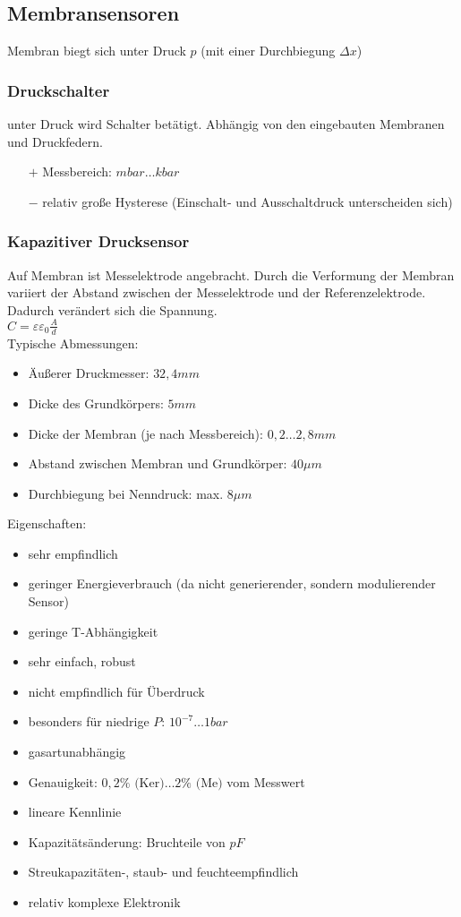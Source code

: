 \subsection{Membransensoren}
Membran biegt sich unter Druck $p$ (mit einer Durchbiegung $\Delta x$)

\subsubsection{Druckschalter}
unter Druck wird Schalter betätigt. Abhängig von den eingebauten Membranen und Druckfedern.
\begin{itemize}
\item[$+$] Messbereich: $\unit{mbar}\dots\unit{kbar}$
\item[$-$] relativ große Hysterese (Einschalt- und Ausschaltdruck unterscheiden sich)
\end{itemize}
\subsubsection{Kapazitiver Drucksensor}
Auf Membran ist Messelektrode angebracht. Durch die Verformung der Membran variiert der Abstand zwischen der Messelektrode und der Referenzelektrode. Dadurch verändert sich die Spannung.\\
$C=\varepsilon\varepsilon_0\frac{A}{d}$\\
Typische Abmessungen:
\begin{itemize}
\item Äußerer Druckmesser: $32,4\unit{mm}$
\item Dicke des Grundkörpers: $5\unit{mm}$
\item Dicke der Membran (je nach Messbereich): $0,2\dots 2,8 \unit{mm}$
\item Abstand zwischen Membran und Grundkörper: $40\unit{\mu m}$
\item Durchbiegung bei Nenndruck: max. $8 \unit{\mu m}$
\end{itemize}
Eigenschaften:
\begin{itemize}[label=$+$]
\item sehr empfindlich
\item geringer Energieverbrauch (da nicht generierender, sondern modulierender Sensor)
\item geringe T-Abhängigkeit
\item sehr einfach, robust
\item nicht empfindlich für Überdruck
\item besonders für niedrige $\unit{P}$: $10^{-7}\dots 1 \unit{bar}$
\item gasartunabhängig
\item Genauigkeit: $0,2\%\text{ (Ker)}\dots2\%\text{ (Me)}$ vom Messwert
\item lineare Kennlinie
\end{itemize}
\begin{itemize}[label=$-$]
\item Kapazitätsänderung: Bruchteile von $\unit{pF}$
\item Streukapazitäten-, staub- und feuchteempfindlich
\item relativ komplexe Elektronik
\end{itemize}

